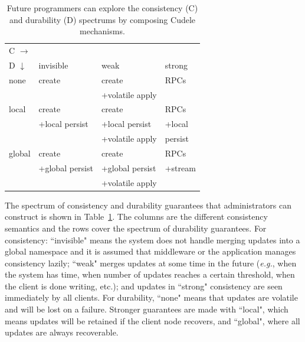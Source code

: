 \begin{table}[t]
\begin{center}
\caption{Future programmers can explore the consistency (C) and
durability (D) spectrums by composing Cudele mechanisms. 
\label{table:spectrum}}
\begin{tabular}{ l | l | l | l }
  C \(\rightarrow\) &&& \\  
  D \(\downarrow\)  	     & invisible         & weak        & strong  \\\hline
  none                       & create            & create          & RPCs    \\
                             &                   & +volatile apply &         \\\hdashline
  local                      & create            & create          & RPCs    \\
                             & +local persist    & +local persist  & +local  \\
                             &                   & +volatile apply &  persist\\\hdashline
  global                     & create            & create          & RPCs    \\
                             & +global persist   & +global persist & +stream \\
                             &                   & +volatile apply &         \\
\end{tabular}
\end{center}
\end{table}

The spectrum of consistency and durability guarantees that administrators can
construct is shown in Table~\ref{table:spectrum}. The columns are the different
consistency semantics and the rows cover the spectrum of durability guarantees.
For consistency: ``invisible" means the system does not handle merging updates
into a global namespace and it is assumed that middleware or the application
manages consistency lazily; ``weak" merges updates at some time in the
future ({\it e.g.}, when the system has time, when number of updates reaches a
certain threshold, when the client is done writing, etc.); and updates in
``strong" consistency are seen immediately by all clients. For durability,
``none" means that updates are volatile and will be lost on a failure. Stronger
guarantees are made with ``local", which means updates will be retained if the
client node recovers, and ``global", where all updates are always recoverable.

